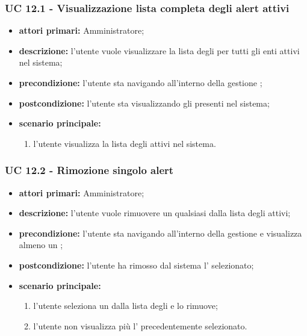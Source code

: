 		\subsubsection{UC 12.1 - Visualizzazione lista completa degli alert attivi}
		\begin{itemize}
			\item \textbf{attori primari:} Amministratore;
			\item \textbf{descrizione:} l'utente vuole visualizzare la lista degli  per tutti gli enti attivi nel sistema;
			\item \textbf{precondizione:} l'utente sta navigando all'interno della gestione ;
			\item \textbf{postcondizione:} l'utente sta visualizzando gli  presenti nel sistema;
			\item \textbf{scenario principale:}
			\begin{enumerate}
				\item{l'utente visualizza la lista degli  attivi nel sistema.}
			\end{enumerate}	
		\end{itemize}

		\subsubsection{UC 12.2 - Rimozione singolo alert}
		\begin{itemize}
			\item \textbf{attori primari:} Amministratore;
			\item \textbf{descrizione:} l'utente vuole rimuovere un qualsiasi  dalla lista degli  attivi;
			\item \textbf{precondizione:} l'utente sta navigando all'interno della gestione  e visualizza almeno un ;
			\item \textbf{postcondizione:} l'utente ha rimosso dal sistema l' selezionato;
			\item \textbf{scenario principale:}
			\begin{enumerate}
				\item{l'utente seleziona un  dalla lista degli  e lo rimuove;}
				\item{l'utente non visualizza più l' precedentemente selezionato.}
			\end{enumerate}	
		\end{itemize}
